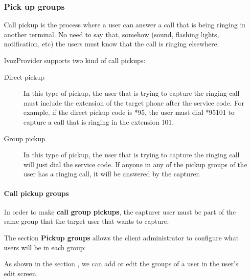 \documentclass[letterpaper,10pt,english]{sphinxmanual}
\begin{document}
\subsubsection{Pick up groups}
\label{administration_portal/client/vpbx/user_configuration/pick_up_groups:capture-groups}\label{administration_portal/client/vpbx/user_configuration/pick_up_groups:pick-up-groups}\label{administration_portal/client/vpbx/user_configuration/pick_up_groups::doc}
Call pickup is the process where a user can answer a call that is being ringing
in another terminal. No need to say that, somehow (sound, flashing lights,
notification, etc) the users must know that the call is ringing elsewhere.

IvozProvider supports two kind of call pickups:
\begin{description}
\item[{Direct pickup}] \leavevmode{}\label{administration_portal/client/vpbx/user_configuration/pick_up_groups:term-direct-pickup}
In this type of pickup, the user that is trying to capture the ringing
call must include the extension of the target phone after the service
code. For example, if the direct pickup code is *95, the user must
dial *95101 to capture a call that is ringing in the extension 101.

\item[{Group pickup}] \leavevmode{}\label{administration_portal/client/vpbx/user_configuration/pick_up_groups:term-group-pickup}
In this type of pickup, the user that is trying to capture the ringing
call will just dial the service code. If anyone in any of the pickup
groups of the user has a ringing call, it will be answered by the
capturer.

\end{description}


\paragraph{Call pickup groups}
\label{administration_portal/client/vpbx/user_configuration/pick_up_groups:call-pickup-groups}
In order to make \textbf{call group pickups}, the capturer user must be part of the
same group that the target user that wants to capture.

The section \textbf{Pickup groups} allows the client administrator to configure
what users will be in each group:

As shown in the section {\hyperref[administration_portal/client/vpbx/users:users]{}}, we can add or edit the groups of a user
in the user's edit screen.
\end{document}

